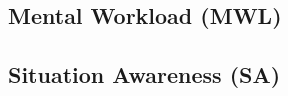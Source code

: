 


%
%    

\subsection{Mental Workload (MWL)}
\label{sec:mental_workload}

    

\subsection{Situation Awareness (SA)}
\label{sec:situation_awareness}

    

%
%        

